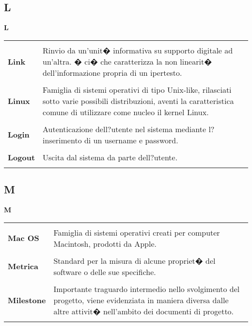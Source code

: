 {\subsection{L} 
\hfill\Huge{\textbf{L}} \\ 
\normalsize 
\begin{longtabu} to 
\toprule \\ 
\textbf{Link} & Rinvio da un'unit� informativa su supporto digitale ad un'altra. � ci� che caratterizza la non linearit� dell'informazione propria di un ipertesto. \\ 
 \\ 
\textbf{Linux} & Famiglia di sistemi operativi di tipo Unix-like, rilasciati sotto varie possibili distribuzioni, aventi la caratteristica comune di utilizzare come nucleo il kernel Linux. \\ 
 \\ 
\textbf{Login} & Autenticazione dell?utente nel sistema mediante l?inserimento di un username e password. \\ 
 \\ 
\textbf{Logout} & Uscita dal sistema da parte dell?utente. \\ 
 \\ 
\end{longtabu} 
\newpage 
\subsection{M} 
\hfill\Huge{\textbf{M}} \\ 
\normalsize 
\begin{longtabu} to 
\toprule \\ 
\textbf{Mac OS} & Famiglia di sistemi operativi creati per computer Macintosh, prodotti da Apple. \\ 
 \\ 
\textbf{Metrica} & Standard per la misura di alcune propriet� del software o delle sue specifiche. \\ 
 \\ 
\textbf{Milestone} & Importante traguardo intermedio nello svolgimento del progetto, viene evidenziata in maniera diversa dalle altre attivit� nell'ambito dei documenti di progetto. \\ 
 \\ 
\end{longtabu} 
\newpage 
}
